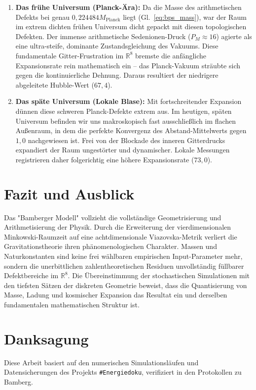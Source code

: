 \documentclass[11pt,a4paper]{article}
\newcommand{\R}{\mathbb{R}}
\newcommand{\Mplanck}{M_{\text{Planck}}}
\begin{document}
\begin{enumerate}
    \item \textbf{Das frühe Universum (Planck-Ära):} Da die Masse des arithmetischen Defekts bei genau $0{,}224484 \Mplanck$ liegt (Gl.~\ref{eq:bps_mass}), war der Raum im extrem dichten frühen Universum dicht gepackt mit diesen topologischen Defekten. Der immense arithmetische Sedenionen-Druck ($P_M \approx 16$) agierte als eine ultra-steife, dominante Zustandsgleichung des Vakuums. Diese fundamentale Gitter-Frustration im $\R^8$ bremste die anfängliche Expansionsrate rein mathematisch ein -- das Planck-Vakuum sträubte sich gegen die kontinuierliche Dehnung. Daraus resultiert der niedrigere abgeleitete Hubble-Wert ($67{,}4$).
    \item \textbf{Das späte Universum (Lokale Blase):} Mit fortschreitender Expansion dünnen diese schweren Planck-Defekte extrem aus. Im heutigen, späten Universum befinden wir uns makroskopisch fast ausschließlich im flachen Außenraum, in dem die perfekte Konvergenz des Abstand-Mittelwerts gegen $1{,}0$ nachgewiesen ist. Frei von der Blockade des inneren Gitterdrucks expandiert der Raum ungestörter und dynamischer. Lokale Messungen registrieren daher folgerichtig eine höhere Expansionsrate ($73{,}0$).
\end{enumerate}

\section{Fazit und Ausblick}
Das "Bamberger Modell" vollzieht die vollständige Geometrisierung und Arithmetisierung der Physik. Durch die Erweiterung der vierdimensionalen Minkowski-Raumzeit auf eine achtdimensionale Viazovska-Metrik verliert die Gravitationstheorie ihren phänomenologischen Charakter. Massen und Naturkonstanten sind keine frei wählbaren empirischen Input-Parameter mehr, sondern die unerbittlichen zahlentheoretischen Residuen unvollständig füllbarer Defektbereiche im $\R^8$. Die Übereinstimmung der stochastischen Simulationen mit den tiefsten Sätzen der diskreten Geometrie beweist, dass die Quantisierung von Masse, Ladung und kosmischer Expansion das Resultat ein und derselben fundamentalen mathematischen Struktur ist.

\section*{Danksagung}
Diese Arbeit basiert auf den numerischen Simulationsläufen und Datensicherungen des Projekts \texttt{\#Energiedoku}, verifiziert in den Protokollen zu Bamberg.
\end{document}
